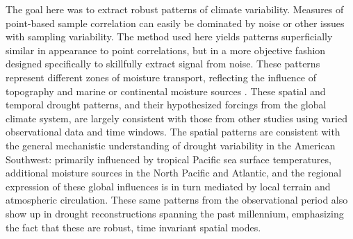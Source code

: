 \documentclass[10pt]{iopart}
\begin{document}
The goal here was to extract robust patterns of climate variability. Measures of point-based sample correlation can easily be dominated by noise or other issues with sampling variability. The method used here yields patterns superficially similar in appearance to point correlations, but in a more objective fashion designed specifically to skillfully extract signal from noise. These patterns represent different zones of moisture transport, reflecting the influence of topography and marine or continental moisture sources \parencite{Liu2010, Hu2011}. These spatial and temporal drought patterns, and their hypothesized forcings from the global climate system, are largely consistent with those from other studies using varied observational data and time windows\parencite{Comrie1999,Cook1999,McCabe1999,McCabe2004,Herrmann2016DivergentElevations,Ryu2010,Seager2014}. The spatial patterns are consistent with the general mechanistic understanding of drought variability in the American Southwest: primarily influenced by tropical Pacific sea surface temperatures, additional moisture sources in the North Pacific and Atlantic, and the regional expression of these global influences is in turn mediated by local terrain and atmospheric circulation. These same patterns from the observational period also show up in drought reconstructions spanning the past millennium, emphasizing the fact that these are robust, time invariant spatial modes.
\end{document}
